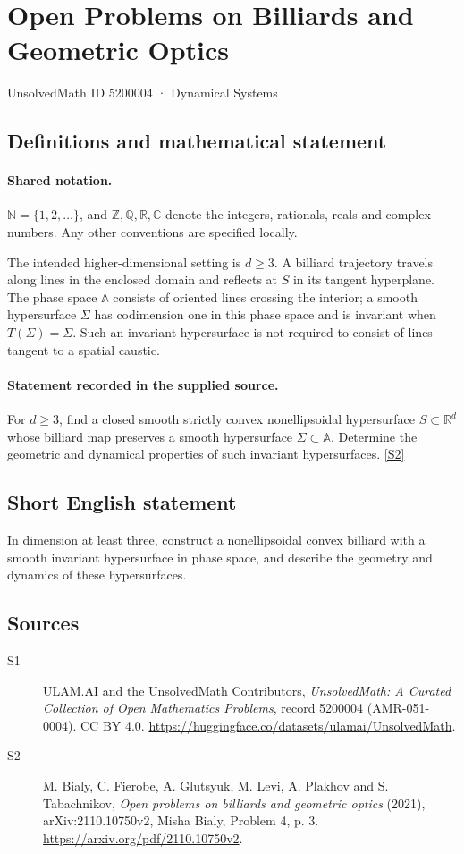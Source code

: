 \documentclass[11pt]{article}
\newcommand{\sref}[2]{\hyperlink{source:#1:#2}{[S#2]}}
\begin{document}
\setcounter{section}{5200003}
\section{Open Problems on Billiards and Geometric Optics}\label{5200004}
{\small\sffamily UnsolvedMath ID 5200004 · Dynamical Systems}
\subsection{Definitions and mathematical statement}

\paragraph{Shared notation.}$\mathbb N=\{1,2,\ldots\}$, and $\mathbb Z,\mathbb Q,\mathbb R,\mathbb C$ denote the integers, rationals, reals and complex numbers. Any other conventions are specified locally.


The intended higher-dimensional setting is $d\ge3$. A billiard trajectory travels along lines in the enclosed domain and reflects at $S$ in its tangent hyperplane. The phase space $\mathbb A$ consists of oriented lines crossing the interior; a smooth hypersurface $\Sigma$ has codimension one in this phase space and is invariant when $T(\Sigma)=\Sigma$. Such an invariant hypersurface is not required to consist of lines tangent to a spatial caustic.
\paragraph{Statement recorded in the supplied source.}
For $d\ge3$, find a closed smooth strictly convex nonellipsoidal hypersurface $S\subset\mathbb R^d$ whose billiard map preserves a smooth hypersurface $\Sigma\subset\mathbb A$. Determine the geometric and dynamical properties of such invariant hypersurfaces. \sref{5200004}{2}
\subsection{Short English statement}
In dimension at least three, construct a nonellipsoidal convex billiard with a smooth invariant hypersurface in phase space, and describe the geometry and dynamics of these hypersurfaces.
\subsection{Sources}
\begin{description}
\item[\hypertarget{source:5200004:1}{S1}] ULAM.AI and the UnsolvedMath Contributors, \emph{UnsolvedMath: A Curated Collection of Open Mathematics Problems}, record 5200004 (AMR-051-0004). CC BY 4.0. \url{https://huggingface.co/datasets/ulamai/UnsolvedMath}.
\item[\hypertarget{source:5200004:2}{S2}] M. Bialy, C. Fierobe, A. Glutsyuk, M. Levi, A. Plakhov and S. Tabachnikov, \emph{Open problems on billiards and geometric optics} (2021), arXiv:2110.10750v2, Misha Bialy, Problem 4, p. 3. \url{https://arxiv.org/pdf/2110.10750v2}.
\end{description}
\label{end:5200004}
\end{document}
